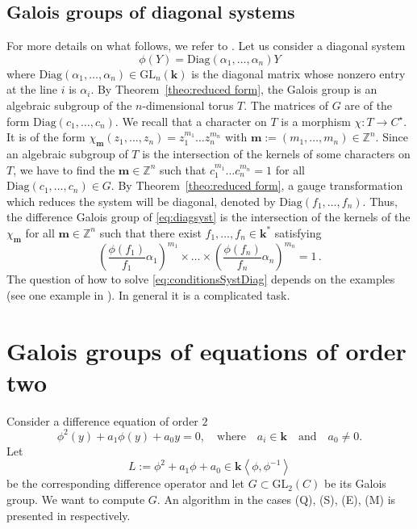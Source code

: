 \documentclass[a4paper,11pt]{amsart}
\newcommand{\GL}{\operatorname{GL}}
\def\k{\mathbf{k}}
\def\GL{\mathrm{GL}}
\begin{document}
\subsection{Galois groups of diagonal systems}\label{sec:diagonalCase}

For more details on what follows, we refer to \cite[Section 2.2]{van2006galois}.
Let us consider a diagonal system 
\begin{equation}
\label{eq:diagsyst}
\phi(Y)=\mathrm{Diag}\left(\alpha_1,\ldots,\alpha_n\right) Y 
\end{equation}
where $\mathrm{Diag}\left(\alpha_1,\ldots,\alpha_n\right)\in\GL_n\left(\k\right)$ is the diagonal matrix whose nonzero entry at the line $i$ is $\alpha_i$.  
By Theorem~\ref{theo:reduced form}, the Galois group is an algebraic subgroup of the $n$-dimensional torus $T$.  The matrices of $G$ are of the form $\mathrm{Diag} (c_1, \dots , c_n)$.  We recall that a character on $T$ is a morphism $\chi:T\rightarrow C^{\star}$. It is of the form   $\chi_{\mathbf{m}}(z_1,\ldots,z_n)=z_1^{m_1}\ldots z_n^{m_n}$ with $\mathbf{m}:=\left(m_1,\ldots,m_n\right)\in\mathbb{Z}^n$. Since an algebraic subgroup of $T$ is the intersection of the kernels of some characters on $T$, we have to find the $\mathbf{m}\in\mathbb{Z}^n$ such that $c_1^{m_1}\ldots c_n^{m_n}=1$ for all  $\mathrm{Diag} (c_1, \dots , c_n) \in G$. 
By Theorem~\ref{theo:reduced form}, a gauge transformation which reduces the system will be diagonal, denoted by  $\mathrm{Diag}(f_1,\dots,f_n)$. Thus, the difference Galois group of \eqref{eq:diagsyst} is the intersection of the kernels of the $\chi_{\mathbf{m}}$ for all $\mathbf{m}\in\mathbb{Z}^n$ such that there exist $f_1,\ldots, f_n\in\k^*$ satisfying
\begin{equation}
\label{eq:conditionsSystDiag}
 \left(\frac{\phi(f_1)}{f_1}\alpha_1 \right)^{m_{1}}\times\ldots \times \left(\frac{\phi(f_n)}{f_n} \alpha_n \right)^{m_{n}}= 1\,.   
\end{equation} 
The question of how to solve  \eqref{eq:conditionsSystDiag} depends on the examples (see one example in \cite[Section 2.2]{van2006galois}). In general it is a complicated task.

\section{Galois groups of equations of order two}\label{secord2}
Consider a difference equation of order $2$
$$  \phi^2 (y)+a_1 \phi (y)+a_0 y=0, \quad \text{where}\quad  a_i\in \k\quad \text{and}\quad  a_0  \neq 0.$$
 Let 
 $$
 L :=   \phi^2 +a_1 \phi +a_0\in \k\left< \phi,\phi^{-1}\right>
 $$ 
be the corresponding difference operator and let $G\subset \GL_{2}(C)$ be its Galois group.  We want to compute $G$.  An algorithm in the cases (Q), (S), (E), (M) is presented in \cite{hendriks1997algorithm, hendriks1998algorithm,  dreyfus2015galois,roques2018algebraic} respectively.   
\end{document}
